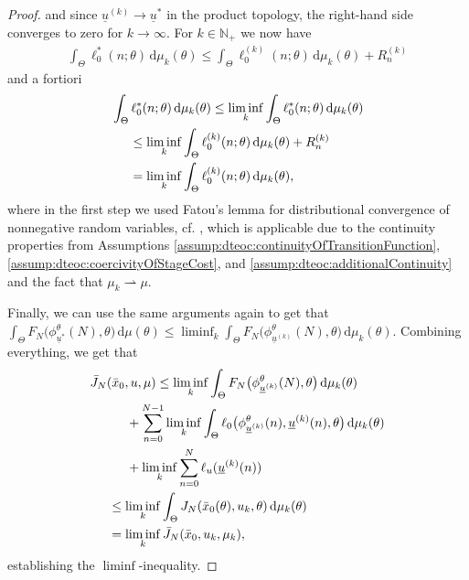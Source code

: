 \documentclass[letterpaper, 10 pt, conference]{IEEEconf}  %
\newcommand{\Np}{\mathbb{N}_+} %
\newcommand{\diff}{\, \mathrm{d}} %
\newcommand{\weak}{\rightharpoonup} %
\newcommand{\s}{\phi} %
\newcommand{\es}{\bar{x}} %
\newcommand{\is}[1]{{\underline{#1}}} %
\theoremstyle{theorem}
\theoremstyle{definition}
\theoremstyle{remark}
\begin{document}
\begin{proof}
and since $\is{u}^{(k)}\rightarrow \is{u}^\ast$ in the product topology, the right-hand side converges to zero for $k\rightarrow\infty$.
For $k\in\Np$ we now have
\begin{align*}
     \int_\Theta \ell_0^\ast(n;\theta) \diff \mu_k(\theta)
     \leq \int_\Theta\ell_0^{(k)}(n;\theta) \diff \mu_k(\theta) + R^{(k)}_n
\end{align*}
and a fortiori
\begin{align*}
    &  \int_\Theta \ell_0^\ast(n;\theta) \diff \mu_k(\theta)
        \leq \liminf_k \int_\Theta \ell_0^\ast(n;\theta) \diff \mu_k(\theta) \\
    & \hspace{0.5cm} \leq \liminf_k \int_\Theta \ell_0^{(k)}(n;\theta) \diff \mu_k(\theta)
        + R^{(k)}_n \\
    & \hspace{0.5cm} =  \liminf_k \int_\Theta \ell_0^{(k)}(n;\theta) \diff \mu_k(\theta),
\end{align*} 
where in the first step we used Fatou's lemma for distributional convergence of nonnegative random variables, cf. \cite[Lemma~5.11]{kallenberg2021foundations},
which is applicable due to the continuity properties from Assumptions \ref{assump:dteoc:continuityOfTransitionFunction}, \ref{assump:dteoc:coercivityOfStageCost}, and \ref{assump:dteoc:additionalContinuity} and the fact that $\mu_k \weak \mu$.

Finally, we can use the same arguments again to get that
$    \int_\Theta F_N\big( \s_{\is{u}^\ast}^\theta(N), \theta \big) \diff \mu(\theta) 
     \leq
    \liminf_k \int_\Theta F_N\big( \s_{\is{u}^{(k)}}^\theta(N), \theta \big) \diff \mu_k(\theta)$.
Combining everything, we get that
\begin{align*}
    & \bar J_N(\es_0, u, \mu) \leq  \liminf_k \int_\Theta F_N\big( \s_{\is{u}^{(k)}}^\theta(N), \theta \big) \diff \mu_k(\theta) \\
        & \hspace{1cm} +  \sum_{n=0}^{N-1} \liminf_k \int_\Theta  \ell_0 \big( \s_{\is{u}^{(k)}}^\theta(n), \is{u}^{(k)}(n), \theta \big) \diff \mu_k(\theta) \\
        & \hspace{1cm} + \liminf_k  \sum_{n=0}^N \ell_u(\is{u}^{(k)}(n)) \\
    & \hspace{0.5cm} \leq \liminf_k \int_\Theta J_N(\es_0(\theta),u_k,\theta) \diff \mu_k(\theta) \\
    & \hspace{0.5cm} = \liminf_k \bar J_N(\es_0, u_k, \mu_k),
\end{align*}
establishing the $\liminf$-inequality.


\end{proof}
\end{document}
